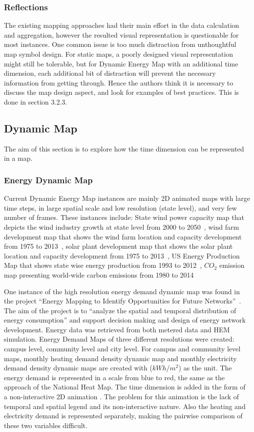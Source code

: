 \documentclass[hidelinks,12pt]{article}
\begin{document}
\subsubsection{Reflections}\label{Reflection}
The existing mapping approaches had their main effort in the data
calculation and aggregation, however the resulted visual
representation is questionable for most instances. One common issue is
too much distraction from unthoughtful map symbol design. For
static maps, a poorly designed visual representation might still be
tolerable, but for Dynamic Energy Map with an additional time
dimension, each additional bit of distraction will prevent the
necessary information from getting through. Hence the authors think it
is necessary to discuss the map design aspect, and look for examples
of best practices. This is done in section 3.2.3.

\subsection{Dynamic Map}
The aim of this section is to explore how the time dimension can be
represented in a map.
\subsubsection{Energy Dynamic Map}
Current Dynamic Energy Map instances are mainly 2D animated maps with
large time steps, in large spatial scale and low resolution (state
level), and very few number of frames. These instances include: State
wind power capacity map that depicts the wind industry growth at state
level from 2000 to 2050~\cite{DOEWind}, wind farm development map that
shows the wind farm location and capacity development from 1975 to
2013~\cite{DOEWindFarm}, solar plant development map that shows the
solar plant location and capacity development from 1975 to
2013~\cite{DOESolarPlant}, US Energy Production Map that shows
state wise energy production from 1993 to 2012~\cite{DOEEnergyProduct},
$CO_2$ emission map presenting world-wide carbon emissions from 1980 to
2014~\cite{CO2Atlas}

One instance of the high resolution energy demand dynamic map was
found in the project ``Energy Mapping to Identify Opportunities for
Future Networks''~\cite{Diaz2013}. The aim of the project is to
``analyze the spatial and temporal distribution of energy
consumption'' and support decision making and design of energy network
development. Energy data was retrieved from both metered data and HEM
simulation. Energy Demand Maps of three different resolutions were
created: campus level, community level and city level. For campus and
community level maps, monthly heating demand density dynamic map and
monthly electricity demand density dynamic maps are created with
($kWh/m^2$) as the unit. The energy demand is represented in a scale
from blue to red, the same as the approach of the National Heat
Map. The time dimension is added in the form of a non-interactive 2D
animation . The problem for this animation is the lack of temporal and
spatial legend and its non-interactive nature. Also the heating and
electricity demand is represented separately, making the pairwise
comparison of these two variables difficult.
\end{document}
